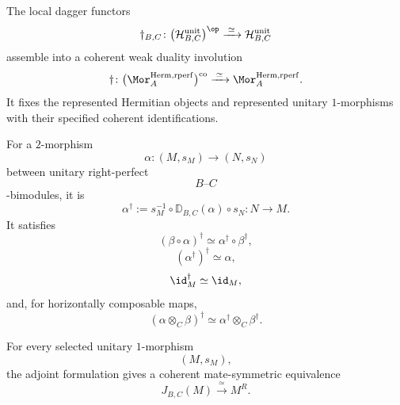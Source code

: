 \begin{theorem}
\label{thm:global-hermitian-dagger}
The local dagger functors
\[
    \dagger_{B,C}
    \colon
    \bigl(
        \mathcal H^{\mathrm{unit}}_{B,C}
    \bigr)^{\op}
    \xrightarrow{\;\simeq\;}
    \mathcal H^{\mathrm{unit}}_{B,C}
\]
assemble into a coherent weak duality involution
\[
    \dagger
    \colon
    \bigl(
        \Mor_A^{\mathrm{Herm,rperf}}
    \bigr)^{\mathrm{co}}
    \xrightarrow{\;\simeq\;}
    \Mor_A^{\mathrm{Herm,rperf}}.
\]
It fixes the represented Hermitian objects and represented unitary
$1$-morphisms with their specified coherent identifications.

For a $2$-morphism
\[
    \alpha
    \colon
    (M,s_M)
    \longrightarrow
    (N,s_N)
\]
between unitary right-perfect
\[
    B\text{--}C
\]
-bimodules, it is
\[
    \alpha^\dagger
    :=
    s_M^{-1}
    \circ
    \mathbb D_{B,C}(\alpha)
    \circ
    s_N
    \colon
    N
    \longrightarrow
    M.
\]
It satisfies
\[
    (\beta\circ\alpha)^\dagger
    \simeq
    \alpha^\dagger\circ\beta^\dagger,
\]
\[
    (\alpha^\dagger)^\dagger
    \simeq
    \alpha,
\]
\[
    \id_M^\dagger
    \simeq
    \id_M,
\]
and, for horizontally composable maps,
\[
    (\alpha\otimes_C\beta)^\dagger
    \simeq
    \alpha^\dagger\otimes_C\beta^\dagger.
\]

For every selected unitary $1$-morphism
\[
    (M,s_M),
\]
the adjoint formulation gives a coherent mate-symmetric equivalence
\[
    J_{B,C}(M)
    \xrightarrow{\;\simeq\;}
    M^R.
\]
\end{theorem}

